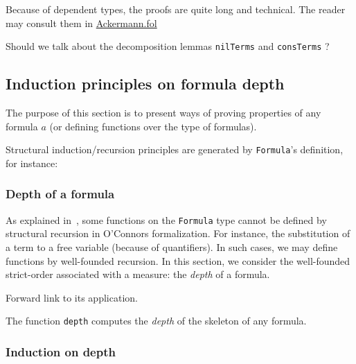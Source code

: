 Because of dependent types, the proofs are quite long and technical. The reader may consult them in \href{../theories/html/hydras.Ackermann.fol.html}{Ackermann.fol}

\begin{todo}
  Should we talk about the decomposition lemmas
\texttt{nilTerms} and \texttt{consTerms} ?
\end{todo}


\subsection{Induction principles on formula depth}




The purpose of this section is to present ways of proving 
properties of any formula $a$ (or defining functions over the type of formulas).

Structural induction/recursion principles are generated by 
\texttt{Formula}'s definition, for instance:








\subsubsection{Depth of a formula}
As explained in~\cite{OConnor05}, some functions on the \texttt{Formula} type cannot be defined by structural recursion in 
O'Connors formalization. For instance, the substitution of a term to a free variable (because of quantifiers). 
In such cases, we may define functions by well-founded recursion. In this section, we consider the well-founded strict-order associated with a measure: the \emph{depth} of a formula.

\begin{todo}
Forward link to its application.
\end{todo}


The function \texttt{depth} computes the \emph{depth} of the 
 skeleton of any formula.


\subsubsection{Induction on depth}

